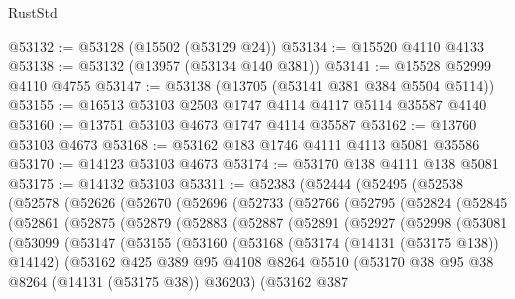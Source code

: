 \begin{lexlean}{RustStd}
\begin{coremodule}
@53132 := @53128 (@15502 (@53129 @24))
@53134 := @15520 @4110 @4133
@53138 := @53132 (@13957 (@53134 @140 @381))
@53141 := @15528 @52999 @4110 @4755
@53147 := @53138 (@13705 (@53141 @381 @384 @5504 @5114))
@53155 := @16513 @53103 @2503 @1747 @4114 @4117 @5114 @35587 @4140
@53160 := @13751 @53103 @4673 @1747 @4114 @35587
@53162 := @13760 @53103 @4673
@53168 := @53162 @183 @1746 @4111 @4113 @5081 @35586
@53170 := @14123 @53103 @4673
@53174 := @53170 @138 @4111 @138 @5081
@53175 := @14132 @53103
@53311 := @52383
    (@52444
      (@52495
        (@52538
          (@52578
            (@52626
              (@52670
                (@52696
                  (@52733
                    (@52766
                      (@52795
                        (@52824
                          (@52845
                            (@52861
                              (@52875
                                (@52879
                                  (@52883
                                    (@52887
                                      (@52891
                                        (@52927
                                          (@52998
                                            (@53081
                                              (@53099
                                                (@53147
                                                  (@53155
                                                    (@53160
                                                      (@53168
                                                        (@53174 (@14131 (@53175 @138)) @14142)
                                                        (@53162
                                                          @425
                                                          @389
                                                          @95
                                                          @4108
                                                          @8264
                                                          @5510
                                                          (@53170
                                                            @38
                                                            @95
                                                            @38
                                                            @8264
                                                            (@14131 (@53175 @38))
                                                            @36203)
                                                          (@53162
                                                            @387

\end{coremodule}
\end{lexlean}

